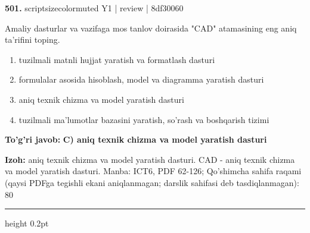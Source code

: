 \documentclass[10pt,a4paper]{article}
\begin{document}
{\bfseries\sffamily\color{ink} 501.} {scriptsizecolor{muted} Y1 | review | 8df30060}
\par
Amaliy dasturlar va vazifaga mos tanlov doirasida "CAD" atamasining eng aniq ta'rifini toping.
\begin{enumerate}[label=\Alph*),leftmargin=9mm]
\item tuzilmali matnli hujjat yaratish va formatlash dasturi
\item formulalar asosida hisoblash, model va diagramma yaratish dasturi
\item aniq texnik chizma va model yaratish dasturi
\item tuzilmali ma'lumotlar bazasini yaratish, so'rash va boshqarish tizimi
\end{enumerate}
\begin{tcolorbox}[enhanced,breakable,colback=teal!4,colframe=teal!60!black,boxrule=0.45pt,arc=1.2mm,left=2.7mm,right=2.7mm,top=1.8mm,bottom=1.8mm,before skip=2mm,after skip=2mm]
{\bfseries\sffamily\color{teal}To'g'ri javob:} \textbf{C) aniq texnik chizma va model yaratish dasturi}
\par\smallskip
{\bfseries Izoh:} aniq texnik chizma va model yaratish dasturi. CAD - aniq texnik chizma va model yaratish dasturi. Manba: ICT6, PDF 62-126; Qo'shimcha sahifa raqami (qaysi PDFga tegishli ekani aniqlanmagan; darslik sahifasi deb tasdiqlanmagan): 80
\end{tcolorbox}
\vspace{2mm}\hrule height 0.2pt\vspace{3mm}
\end{document}
